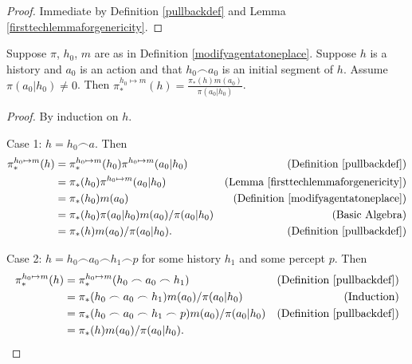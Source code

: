 \documentclass[runningheads]{llncs}
\begin{document}
\begin{proof}
    Immediate by Definition \ref{pullbackdef} and Lemma \ref{firsttechlemmaforgenericity}.
\end{proof}

\begin{lemma}
\label{secondtechlemmaforgenericity}
    Suppose $\pi$, $h_0$, $m$ are as in Definition \ref{modifyagentatoneplace}.
    Suppose $h$ is a history and $a_0$ is an action and that $h_0\frown a_0$ is
    an initial segment of $h$. Assume $\pi(a_0|h_0)\not=0$. Then
    $\pi^{h_0\mapsto m}_*(h) = \frac{\pi_*(h)m(a_0)}{\pi(a_0|h_0)}$.
\end{lemma}

\begin{proof}
    By induction on $h$.

    Case 1: $h=h_0\frown a$. Then
    \begin{align*}
        \pi^{h_0\mapsto m}_*(h)
        &= \pi^{h_0\mapsto m}_*(h_0)\pi^{h_0\mapsto m}(a_0|h_0)
            &\mbox{(Definition \ref{pullbackdef})}\\
        &= \pi_*(h_0)\pi^{h_0\mapsto m}(a_0|h_0)
            &\mbox{(Lemma \ref{firsttechlemmaforgenericity})}\\
        &= \pi_*(h_0)m(a_0)
            &\mbox{(Definition \ref{modifyagentatoneplace})}\\
        &= \pi_*(h_0)\pi(a_0|h_0)m(a_0)/\pi(a_0|h_0)
            &\mbox{(Basic Algebra)}\\
        &= \pi_*(h)m(a_0)/\pi(a_0|h_0).
            &\mbox{(Definition \ref{pullbackdef})}
    \end{align*}

    Case 2: $h=h_0\frown a_0\frown h_1\frown p$ for some history $h_1$
        and some percept $p$. Then
    \begin{align*}
        \pi^{h_0\mapsto m}_*(h)
        &= \pi^{h_0\mapsto m}_*(h_0\frown a_0\frown h_1)
            &\mbox{(Definition \ref{pullbackdef})}\\
        &= \pi_*(h_0\frown a_0\frown h_1)m(a_0)/\pi(a_0|h_0)
            &\mbox{(Induction)}\\
        &= \pi_*(h_0\frown a_0\frown h_1\frown p)m(a_0)/\pi(a_0|h_0)
            &\mbox{(Definition \ref{pullbackdef})}\\
        &= \pi_*(h)m(a_0)/\pi(a_0|h_0).
    \end{align*}


\end{proof}
\end{document}
